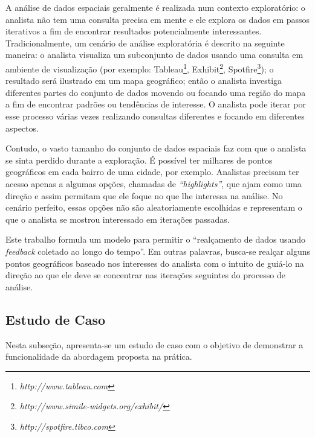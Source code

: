 A análise de dados espaciais geralmente é realizada num contexto exploratório: o analista não tem uma consulta precisa em mente e ele explora os dados em passos iterativos a fim de encontrar resultados potencialmente interessantes. Tradicionalmente, um cenário de análise exploratória é descrito na seguinte maneira: o analista visualiza um subconjunto de dados usando uma consulta em ambiente de visualização (por exemplo: Tableau\footnote{\em http://www.tableau.com},
Exhibit\footnote{\em http://www.simile-widgets.org/exhibit/},
Spotfire\footnote{\em http://spotfire.tibco.com}); o resultado será ilustrado em um mapa geográfico; então o analista investiga diferentes partes do conjunto de dados movendo ou focando uma região do mapa a fim de encontrar padrões ou tendências de interesse. O analista pode iterar por esse processo várias vezes realizando consultas diferentes e focando em diferentes aspectos.

Contudo, o vasto tamanho do conjunto de dados espaciais faz com que o analista se sinta perdido durante a exploração. É possível ter milhares de pontos geográficos em cada bairro de uma cidade, por exemplo. Analistas precisam ter acesso apenas a algumas opções, chamadas de {\em ``highlights''}, que ajam como uma direção e assim permitam que ele foque no que lhe interessa na análise. No cenário perfeito, essas opções não são aleatoriamente escolhidas e representam o que o analista se mostrou interessado em iterações passadas.

Este trabalho formula um modelo para permitir o ``realçamento de dados usando {\em feedback} coletado ao longo do tempo''. Em outras palavras, busca-se realçar alguns pontos geográficos baseado nos interesses do analista com o intuito de guiá-lo na direção ao que ele deve se concentrar nas iterações seguintes do processo de análise.

\subsection{Estudo de Caso}

Nesta subseção, apresenta-se um estudo de caso com o objetivo de demonstrar a funcionalidade da abordagem proposta na prática.

